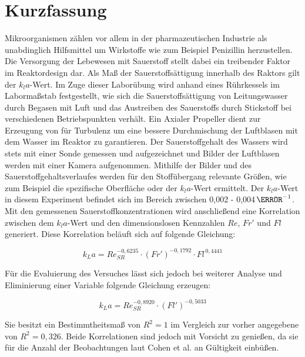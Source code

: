 \documentclass[12pt,liststotoc]{report}
\begin{document}

\chapter*{Kurzfassung}
Mikroorganismen zählen vor allem in der pharmazeutischen Industrie als unabdinglich Hilfsmittel um Wirkstoffe wie zum Beispiel Penizillin herzustellen. Die Versorgung der Lebewesen mit Sauerstoff stellt dabei ein treibender Faktor im Reaktordesign dar. Als Maß der Sauerstoffsättigung innerhalb des Raktors gilt der $k_la$-Wert. Im Zuge dieser Laborübung wird anhand eines Rührkessels im Labormaßstab festgestellt, wie sich die Sauerstoffsättigung von Leitungswasser durch Begasen mit Luft und das Austreiben des Sauerstoffs durch Stickstoff bei verschiedenen Betriebspunkten verhält. Ein Axialer Propeller dient zur Erzeugung von für Turbulenz um eine bessere Durchmischung der Luftblasen mit dem Wasser im Reaktor zu garantieren. Der Sauerstoffgehalt des Wassers wird stets mit einer Sonde gemessen und aufgezeichnet und Bilder der Luftblasen werden mit einer Kamera aufgenommen. Mithilfe der Bilder und des Sauerstoffgehaltsverlaufes werden für den Stoffübergang relevante Größen, wie zum Beispiel die spezifische Oberfläche oder der $k_la$-Wert ermittelt. Der $k_la$-Wert in diesem Experiment befindet sich im Bereich zwischen 0,002 - 0,004\,$\s^{-1}$. Mit den gemessenen Sauerstoffkonzentrationen wird anschließend eine Korrelation zwischen dem $k_la$-Wert und den dimensionslosen Kennzahlen $Re$, $Fr'$ und $Fl$ generiert. Diese Korrelation beläuft sich auf folgende Gleichung:

\begin{equation*}
    k_La = Re_{SR}^{-0,6235} \cdot \left(Fr'\right)^{-0,1792} \cdot Fl^{\,0,4441}
\end{equation*}

Für die Evaluierung des Versuches lässt sich jedoch bei weiterer Analyse und Eliminierung einer Variable folgende Gleichung erzeugen:

\begin{equation*}
    k_La = Re_{SR}^{-0,8920} \cdot \left(Fl'\right)^{-0,5033}
\end{equation*}

Sie besitzt ein Bestimmtheitsmaß von $R^2 = 1$ im Vergleich zur vorher angegebene von $R^2 = 0,326$. Beide Korrelationen sind jedoch mit Vorsicht zu genießen, da sie für die Anzahl der Beobachtungen laut Cohen et al. \cite{regression} an Gültigkeit einbüßen. 
\tableofcontents
\newpage
{}
\end{document}
